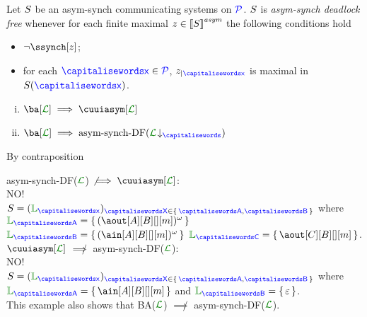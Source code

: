 \begin{definition}
Let $S$ be an asym-synch communicating systems on $\mathcal{\color{blue}{P}}$.
$S$ is {\em asym-synch deadlock free} whenever for each finite maximal 
$z\in{\llbracket S\rrbracket}^{\textit{asym}}$ the following conditions hold
\begin{itemize}
\item
$\neg\ssynch[z]$;
\item
for each $\px\in\ptpset$, $\filter{z}{\px}$ is maximal in $\aCS(\px)$.
\end{itemize}
\end{definition}

%


\begin{lemma}
\begin{enumerate}[i)]
\item
$\ba[\clang] \implies \cuuiasym[\clang]$
\item
$\ba[\clang] \implies \text{asym-synch-DF}(\proj{\clang}{})$
\end{enumerate}
\end{lemma}
By contraposition


asym-synch-DF($\clang$) $\not\implies \cuuiasym[\clang]$:\\NO!\\
$\aCS=  ({\alang}_{\px})_{\ptp[X] \in\Set{\p,\q}}$ where\\
$\alang_{\p}= \Set{(\aout[A][B][][m])^\omega}$ 
\qquad $\alang_{\q}= \Set{(\ain[A][B][][m])^\omega}$
\qquad $\alang_{\ptp[C]}= \Set{\aout[C][B][][m]}$.\\


$\cuuiasym[\clang]$  $\not\implies$ asym-synch-DF($\clang$):\\NO!\\
 $\aCS=  ({\alang}_{\px})_{\ptp[X] \in\Set{\p,\q}}$ where
$\alang_{\p}= \Set{\ain[A][B][][m]}$ and $\alang_{\q}= \Set{\emptyword}$.\\
This example also shows that BA($\clang$)  $\not\implies$ asym-synch-DF($\clang$).



